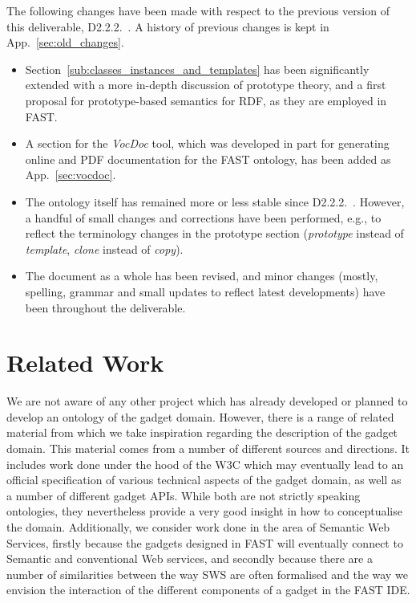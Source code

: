 \documentclass{article}
\begin{document}
The following changes have been made with respect to the previous version of this deliverable, D2.2.2.~\cite{moeller2010fast_ontology}. A history of previous changes is kept in App.~\ref{sec:old_changes}.

\begin{itemize}
	\item Section~\ref{sub:classes_instances_and_templates} has been significantly extended with a more in-depth discussion of prototype theory, and a first proposal for prototype-based semantics for RDF, as they are employed in FAST.
	\item A section for the \emph{VocDoc} tool, which was developed in part for generating online and PDF documentation for the FAST ontology, has been added as App.~\ref{sec:vocdoc}.
	\item The ontology itself has remained more or less stable since D2.2.2.~\cite{moeller2010fast_ontology}. However, a handful of small changes and corrections have been performed, e.g., to reflect the terminology changes in the prototype section (\emph{prototype} instead of \emph{template}, \emph{clone} instead of \emph{copy}).
	\item The document as a whole has been revised, and minor changes (mostly, spelling, grammar and small updates to reflect latest developments) have been throughout the deliverable.
\end{itemize}



\clearpage
\section{Related Work} %
\label{sec:related_work}

We are not aware of any other project which has already developed or planned to develop an ontology of the gadget domain. However, there is a range of related material from which we take inspiration regarding the description of the gadget domain. This material comes from a number of different sources and directions. It includes work done under the hood of the W3C which may eventually lead to an official specification of various technical aspects of the gadget domain, as well as a number of different gadget APIs. While both are not strictly speaking ontologies, they nevertheless provide a very good insight in how to conceptualise the domain. Additionally, we consider work done in the area of Semantic Web Services, firstly because the gadgets designed in FAST will eventually connect to Semantic and conventional Web services, and secondly because there are a number of similarities between the way SWS are often formalised and the way we envision the interaction of the different components of a gadget in the FAST IDE.
\end{document}
